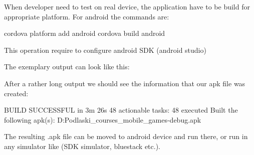 When developer need to test on real device, the application have to be build for appropriate platform. For android the commands are:

\begin{shell}
cordova platform add android
cordova build android
\end{shell}

\begin{remark}
This operation require to configure android SDK (android studio)
\end{remark}

The exemplary output can look like this:

After a rather long output we should see the information that our apk file was created:
\begin{shelloutput}
BUILD SUCCESSFUL in 3m 26s
48 actionable tasks: 48 executed
Built the following apk(s): D:\Users\Krzysztof Podlaski\Documents\Uniwerek\GENIUS\didactic_courses\Cordova_mobile_games\code\UIExamples\platforms\android\app\build\outputs\apk\debug\app-debug.apk
\end{shelloutput}

The resulting .apk file can be moved to android device and run there, or run in any simulator like (SDK simulator, bluestack etc.).




